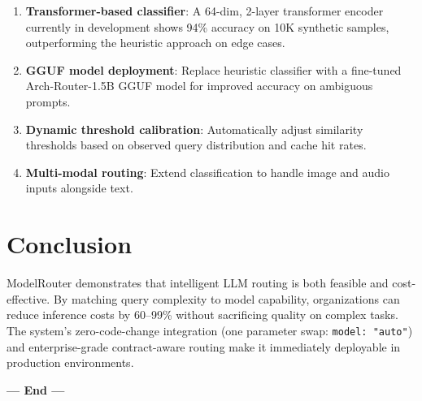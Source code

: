 \documentclass[11pt,a4paper]{article}
\begin{document}
\begin{enumerate}
    \item \textbf{Transformer-based classifier}: A 64-dim, 2-layer transformer encoder currently in development shows 94\% accuracy on 10K synthetic samples, outperforming the heuristic approach on edge cases.
    \item \textbf{GGUF model deployment}: Replace heuristic classifier with a fine-tuned Arch-Router-1.5B GGUF model for improved accuracy on ambiguous prompts.
    \item \textbf{Dynamic threshold calibration}: Automatically adjust similarity thresholds based on observed query distribution and cache hit rates.
    \item \textbf{Multi-modal routing}: Extend classification to handle image and audio inputs alongside text.
\end{enumerate}

\section{Conclusion}

ModelRouter demonstrates that intelligent LLM routing is both feasible and cost-effective. By matching query complexity to model capability, organizations can reduce inference costs by 60--99\% without sacrificing quality on complex tasks. The system's zero-code-change integration (one parameter swap: \texttt{model: "auto"}) and enterprise-grade contract-aware routing make it immediately deployable in production environments.

\begin{center}
\vspace{1em}
\textbf{--- End ---}
\end{center}
\end{document}
